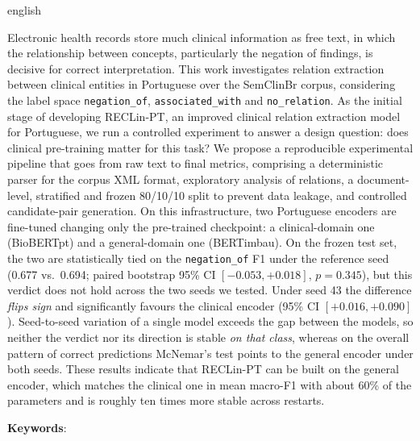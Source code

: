 \begin{resumo}[Abstract]
  \vspace{-15pt}

  \begin{otherlanguage*}{english}

  Electronic health records store much clinical information as free text, in which
  the relationship between concepts, particularly the negation of findings,
  is decisive for correct interpretation. This work investigates relation
  extraction between clinical entities in Portuguese over the SemClinBr corpus,
  considering the label space \texttt{negation\_of}, \texttt{associated\_with} and
  \texttt{no\_relation}. As the initial stage of developing RECLin-PT, an improved
  clinical relation extraction model for Portuguese, we run a controlled
  experiment to answer a design question: does clinical pre-training matter for
  this task? We propose a reproducible experimental pipeline that goes from raw
  text to final metrics, comprising a deterministic parser for the corpus XML
  format, exploratory analysis of relations, a document-level, stratified and
  frozen 80/10/10 split to prevent data leakage, and controlled candidate-pair
  generation. On this infrastructure, two Portuguese encoders are fine-tuned
  changing only the pre-trained checkpoint: a clinical-domain one (BioBERTpt) and
  a general-domain one (BERTimbau). On the frozen test set, the two are
  statistically tied on the \texttt{negation\_of} F1 under the reference seed
  (0.677 vs.\ 0.694; paired bootstrap 95\% CI $[-0.053, +0.018]$, $p=0.345$), but
  this verdict does not hold across the two seeds we tested. Under seed 43 the
  difference \emph{flips sign} and significantly favours the clinical encoder
  (95\% CI $[+0.016, +0.090]$). Seed-to-seed variation of a single model exceeds
  the gap between the models, so neither the verdict nor its direction is stable
  \emph{on that class}, whereas on the overall pattern of correct predictions
  McNemar's test points to the general encoder under both seeds.
  These results indicate that RECLin-PT can be built on the general encoder,
  which matches the clinical one in mean macro-F1 with about 60\% of the
  parameters and is roughly ten times more stable across restarts.

  \vspace{\onelineskip}

  \noindent\textbf{Keywords}: \inlinekeywords
\end{otherlanguage*}
\end{resumo}
